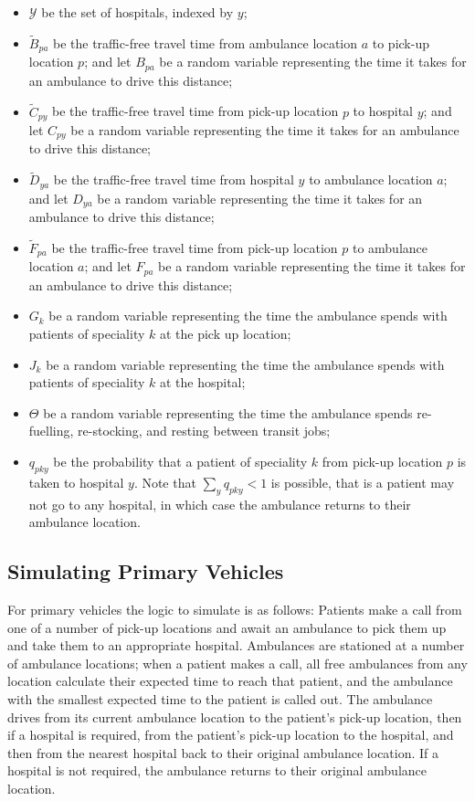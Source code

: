 \documentclass[preprint,12pt]{elsarticle}
\begin{document}
\begin{itemize}
  \item $\mathcal{Y}$ be the set of hospitals, indexed by $y$;
  \item $\tilde{B}_{pa}$ be the traffic-free travel time from ambulance
        location $a$ to pick-up location $p$; and let $B_{pa}$ be a random
        variable representing the time it takes for an ambulance to drive this
        distance;
  \item $\tilde{C}_{py}$ be the traffic-free travel time from pick-up location
        $p$ to hospital $y$; and let $C_{py}$ be a random variable
        representing the time it takes for an ambulance to drive this
        distance;
  \item $\tilde{D}_{ya}$ be the traffic-free travel time from hospital $y$ to
        ambulance location $a$; and let $D_{ya}$ be a random variable
        representing the time it takes for an ambulance to drive this distance;
  \item $\tilde{F}_{pa}$ be the traffic-free travel time from pick-up location
        $p$ to ambulance location $a$; and let $F_{pa}$ be a random variable
        representing the time it takes for an ambulance to drive this distance;
  \item $G_k$ be a random variable representing the time the ambulance spends
        with patients of speciality $k$ at the pick up location;
  \item $J_k$ be a random variable representing the time the ambulance spends
        with patients of speciality $k$ at the hospital;
  \item $\Theta$ be a random variable representing the time the ambulance spends
        re-fuelling, re-stocking, and resting between transit jobs;
  \item $q_{pky}$ be the probability that a patient of speciality $k$ from
        pick-up location $p$ is taken to hospital $y$.
        Note that $\sum_y q_{pky} < 1$ is possible, that is a patient may not
        go to any hospital, in which case the ambulance returns to their
        ambulance location.
\end{itemize}


\subsection{Simulating Primary Vehicles}\label{sec:simulation_primary}
For primary vehicles the logic to simulate is as follows: Patients make a call
from one of a number of pick-up locations and await an ambulance to pick them
up and take them to an appropriate hospital. Ambulances are stationed at a
number of ambulance locations; when a patient makes a call, all free
ambulances from any location calculate their expected time to reach that
patient, and the ambulance with the smallest expected time to the patient is
called out. The ambulance drives from its current ambulance location to the
patient's pick-up location, then if a hospital is required, from the patient's
pick-up location to the hospital, and then from the nearest hospital back to
their original ambulance location. If a hospital is not required, the
ambulance returns to their original ambulance location.
\end{document}
